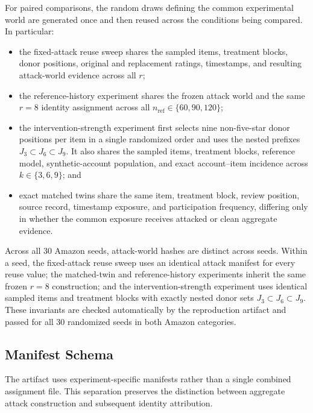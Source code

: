 For paired comparisons, the random draws defining the common experimental world
are generated once and then reused across the conditions being compared. In
particular:
\begin{itemize}
    \item the fixed-attack reuse sweep shares the sampled items, treatment
          blocks, donor positions, original and replacement ratings, timestamps,
          and resulting attack-world evidence across all $r$;
    \item the reference-history experiment shares the frozen attack world and
          the same $r=8$ identity assignment across all
          $n_{\mathrm{ref}}\in\{60,90,120\}$;
    \item the intervention-strength experiment first selects nine non-five-star
          donor positions per item in a single randomized order and uses the
          nested prefixes
          $J_3\subset J_6\subset J_9$. It also shares the sampled items,
          treatment blocks, reference model, synthetic-account population, and
          exact account--item incidence across $k\in\{3,6,9\}$; and
    \item exact matched twins share the same item, treatment block, review
          position, source record, timestamp exposure, and participation
          frequency, differing only in whether the common exposure receives
          attacked or clean aggregate evidence.
\end{itemize}

Across all 30 Amazon seeds, attack-world hashes are distinct across seeds.
Within a seed, the fixed-attack reuse sweep uses an identical attack manifest
for every reuse value; the matched-twin and reference-history experiments
inherit the same frozen $r=8$ construction; and the intervention-strength
experiment uses identical sampled items and treatment blocks with exactly
nested donor sets $J_3\subset J_6\subset J_9$. These invariants are checked automatically by the reproduction artifact
and passed for all 30 randomized seeds in both Amazon categories.


\subsection{Manifest Schema}
\label{sec:supp-manifest}

The artifact uses experiment-specific manifests rather than a single combined
assignment file. This separation preserves the distinction between aggregate
attack construction and subsequent identity attribution.

